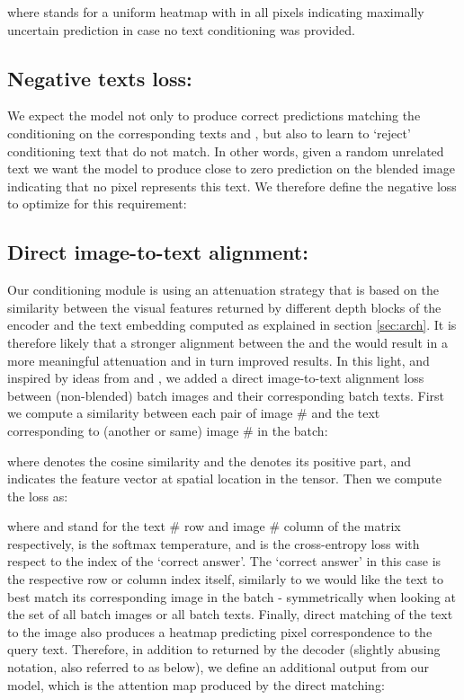 \documentclass[10pt,twocolumn,letterpaper]{article}
\newcommand\secvspace{\vspace{-0.0cm}}
\begin{document}
where  stands for a uniform heatmap with  in all pixels indicating maximally uncertain prediction in case no text conditioning was provided. 


\secvspace
\subsection{Negative texts loss: }\label{sec:neg}
\secvspace
We expect the model not only to produce correct  predictions matching the conditioning on the corresponding texts  and , but also to learn to `reject' conditioning text that do not match. In other words, given a random unrelated text  we want the model to produce close to zero prediction on the blended image  indicating that no pixel represents this text. 
We therefore define the negative loss to optimize for this requirement:


\secvspace
\subsection{Direct image-to-text alignment: }\label{sec:img_text_align}
\secvspace
Our conditioning module  is using an attenuation strategy that is based on the similarity between the visual features  returned by different depth blocks of the encoder  and the text embedding  computed as explained in section \ref{sec:arch}. It is therefore likely that a stronger alignment between the  and the  would result in a more meaningful attenuation and in turn improved results. In this light, and inspired by ideas from \cite{akbari2019multi} and \cite{radford2021learning}, we added a direct image-to-text alignment loss  between (non-blended) batch images and their corresponding batch texts. First we compute a similarity between each pair of image \# and the text corresponding to (another or same) image
\# in the batch:

where  denotes the cosine similarity and the  denotes its positive part,
and  indicates the feature vector at spatial location  in the  tensor. Then we compute the  loss as:

where  and  stand for the text \# row and image \# column of the matrix  respectively,  is the softmax temperature, and  is the cross-entropy loss with respect to the index of the `correct answer'. The `correct answer' in this case is the respective row or column index itself, similarly to \cite{radford2021learning} we would like the text to best match its corresponding image in the batch - symmetrically when looking at the set of all batch images or all batch texts. Finally, direct matching of the text to the image also produces a heatmap predicting pixel correspondence to the query text. Therefore, in addition to  returned by the decoder  (slightly abusing notation, also referred to as  below), we define an additional output  from our model, which is the attention map produced by the direct matching:
\end{document}

